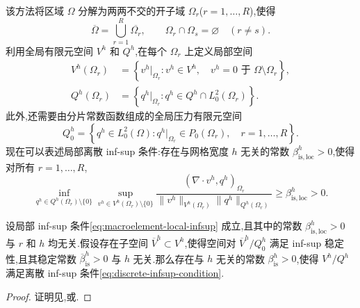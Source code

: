 \clearpage
\begin{note}\label{note:boland-nicolaides-approach}
该方法将区域 $\Omega$ 分解为两两不交的开子域 $\Omega_r$($r=1,\ldots,R$),使得
\[
  \overline{\Omega}=\bigcup_{r=1}^{R}\overline{\Omega_r},
  \qquad
  \Omega_r\cap\Omega_s=\varnothing\quad(r\ne s).
\]
利用全局有限元空间 $V^h$ 和 $Q^h$,在每个 $\Omega_r$ 上定义局部空间
\[
\begin{aligned}
  V^h(\Omega_r)
  &=\left\{v^h|_{\Omega_r}:v^h\in V^h,\quad
         v^h=0\text{ 于 }\Omega\setminus\Omega_r\right\},\\
  Q^h(\Omega_r)
  &=\left\{q^h|_{\Omega_r}:q^h\in Q^h\cap L_0^2(\Omega_r)\right\}.
\end{aligned}
\]
此外,还需要由分片常数函数组成的全局压力有限元空间
\[
  Q_0^h
  =\left\{q^h\in L_0^2(\Omega):
       q^h|_{\Omega_r}\in P_0(\Omega_r),\quad r=1,\ldots,R\right\}.
\]
现在可以表述局部离散 inf-sup 条件:存在与网格宽度 $h$ 无关的常数 $\beta_{\mathrm{is,loc}}^h>0$,使得对所有 $r=1,\ldots,R$,
\begin{equation}\label{eq:macroelement-local-infsup}
  \inf_{q^h\in Q^h(\Omega_r)\setminus\{0\}}
  \sup_{v^h\in V^h(\Omega_r)\setminus\{0\}}
    \frac{(\nabla\cdot v^h,q^h)_{\Omega_r}}
         {\|v^h\|_{V^h(\Omega_r)}\|q^h\|_{Q^h(\Omega_r)}}
  \ge \beta_{\mathrm{is,loc}}^h>0.
\end{equation}
\end{note}

\begin{theorem}\label{thm:boland-nicolaides-macroelement-criterion}
设局部 inf-sup 条件\cref{eq:macroelement-local-infsup} 成立,且其中的常数 $\beta_{\mathrm{is,loc}}^h>0$ 与 $r$ 和 $h$ 均无关.假设存在子空间 $\overline V^h\subset V^h$,使得空间对 $\overline V^h/Q_0^h$ 满足 inf-sup 稳定性,且其稳定常数 $\overline\beta_{\mathrm{is}}^h>0$ 与 $h$ 无关.那么存在与 $h$ 无关的常数 $\beta_{\mathrm{is}}^h>0$,使得 $V^h/Q^h$ 满足离散 inf-sup 条件\cref{eq:discrete-infsup-condition}.
\end{theorem}

\begin{proof}
证明见\textcite{BolandNicolaides1983},或\textcite[第 II 章,定理 1.12]{GiraultRaviart1986}.
\end{proof}

